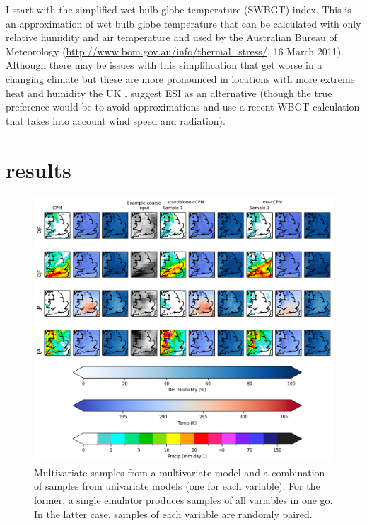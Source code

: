 I start with the simplified wet bulb globe temperature (SWBGT) index. This is an approximation of wet bulb globe temperature that can be calculated with only relative humidity and air temperature \parencite[e.g][]{Blazejczyk2012UTCIcomparison, zhao2015heatstresscmip5, buzan2015heatstress} and used by the Australian Bureau of Meteorology (\url{http://www.bom.gov.au/info/thermal_stress/}, 16 March 2011).
Although there may be issues with this simplification \parencite{kong2022wbgtapproxissues} that get worse in a changing climate but these are more pronounced in locations with more extreme heat and humidity the UK \parencite{qiu2024swbgtbias}. \textcite{kong2022wbgtapproxissues} suggest ESI as an alternative (though the true preference would be to avoid approximations and use a recent WBGT calculation that takes into account wind speed and radiation).


\section{results}
\label{mv:results}

\begin{figure}[ht]
	\centering
	\includegraphics[height=0.35\textheight]{chapters/figures/5_mv/mv-samples.png}
	\caption{Multivariate samples from a multivariate model and a combination of samples from univariate models (one for each variable). For the former, a single emulator produces samples of all variables in one go. In the latter case, samples of each variable are randomly paired.}
	\label{fig:mv-samples}
\end{figure}

